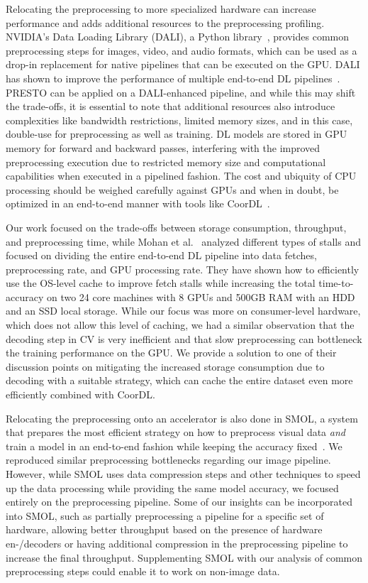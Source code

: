 Relocating the preprocessing to more specialized hardware can increase performance and adds additional resources to the preprocessing profiling.
NVIDIA's Data Loading Library (DALI), a Python library~\cite{dali2020}, provides common preprocessing steps for images, video, and audio formats, which can be used as a drop-in replacement for native pipelines that can be executed on the GPU.
DALI has shown to improve the performance of multiple end-to-end DL pipelines~\cite{mohan2020analyzing,dalibench2019}.
PRESTO can be applied on a DALI-enhanced pipeline, and while this may shift the trade-offs, it is essential to note that additional resources also introduce complexities like bandwidth restrictions, limited memory sizes, and in this case, double-use for preprocessing as well as training.
DL models are stored in GPU memory for forward and backward passes, interfering with the improved preprocessing execution due to restricted memory size and computational capabilities when executed in a pipelined fashion.
The cost and ubiquity of CPU processing should be weighed carefully against GPUs and when in doubt, be optimized in an end-to-end manner with tools like CoorDL~\cite{mohan2020analyzing}.

Our work focused on the trade-offs between storage consumption, throughput, and preprocessing time, while Mohan et al.~\cite{mohan2020analyzing} analyzed different types of stalls and focused on dividing the entire end-to-end DL pipeline into data fetches, preprocessing rate, and GPU processing rate.
They have shown how to efficiently use the OS-level cache to improve fetch stalls while increasing the total time-to-accuracy on two 24 core machines with 8 GPUs and 500\:GB RAM with an HDD and an SSD local storage.
While our focus was more on consumer-level hardware, which does not allow this level of caching, we had a similar observation that the decoding step in CV is very inefficient and that slow preprocessing can bottleneck the training performance on the GPU.
We provide a solution to one of their discussion points on mitigating the increased storage consumption due to decoding with a suitable strategy, which can cache the entire dataset even more efficiently combined with CoorDL.

Relocating the preprocessing onto an accelerator is also done in SMOL, a system that prepares the most efficient strategy on how to preprocess visual data \textit{and} train a model in an end-to-end fashion while keeping the accuracy fixed~\cite{kang2020jointly}.
We reproduced similar preprocessing bottlenecks regarding our image pipeline.
However, while SMOL uses data compression steps and other techniques to speed up the data processing while providing the same model accuracy, we focused entirely on the preprocessing pipeline.
Some of our insights can be incorporated into SMOL, {\color{diff2} such as partially preprocessing a pipeline for a specific set of hardware, allowing better throughput based on the presence of hardware en-/decoders or having additional compression in the preprocessing pipeline to increase the final throughput.}
Supplementing SMOL with our analysis of common preprocessing steps could enable it to work on non-image data.